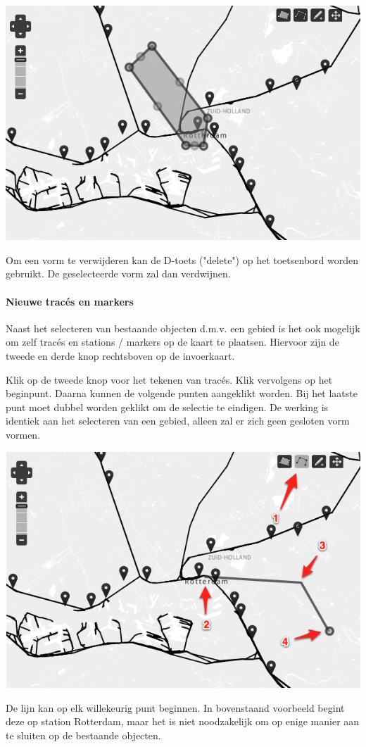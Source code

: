 \begin{center}
\includegraphics[scale=.7]{img/kaart7.png}
\end{center}
Om een vorm te verwijderen kan de D-toets ("delete") op het toetsenbord worden gebruikt. De geselecteerde vorm zal dan verdwijnen.

\paragraph{Nieuwe trac\'{e}s en markers}

Naast het selecteren van bestaande objecten d.m.v. een gebied is het ook mogelijk om zelf trac\'{e}s en stations / markers op de kaart te plaatsen. Hiervoor zijn de tweede en derde knop rechtsboven op de invoerkaart.

Klik op de tweede knop voor het tekenen van trac\'{e}s. Klik vervolgens op het beginpunt. Daarna kunnen de volgende punten aangeklikt worden. Bij het laatste punt moet dubbel worden geklikt om de selectie te eindigen. De werking is identiek aan het selecteren van een gebied, alleen zal er zich geen gesloten vorm vormen.
\begin{center}
\includegraphics[scale=.7]{img/kaart8.png}
\end{center}
De lijn kan op elk willekeurig punt beginnen. In bovenstaand voorbeeld begint deze op station Rotterdam, maar het is niet noodzakelijk om op enige manier aan te sluiten op de bestaande objecten.

